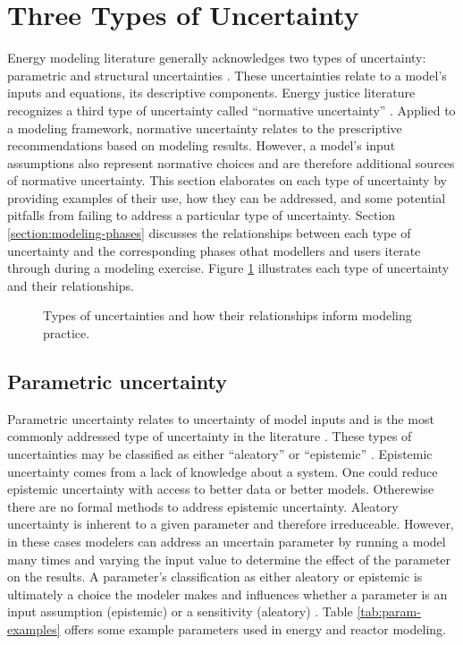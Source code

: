 \section{Three Types of Uncertainty}
\label{section:triple-uncertainty}

Energy modeling literature generally acknowledges two types of uncertainty:
parametric and structural uncertainties
\cite{yue_review_2018,decarolis_modelling_2016,price_modelling_2017,
feng_sensitivity_2020}. These uncertainties relate to a model's inputs and
equations, its descriptive components. Energy justice literature recognizes a
third type of uncertainty called ``normative uncertainty''
\cite{taebi_governing_2020, van_uffelen_revisiting_2024}. Applied to a modeling
framework, normative uncertainty relates to the prescriptive recommendations
based on modeling results. However, a model's input assumptions also represent
normative choices and are therefore additional sources of normative uncertainty.
This section elaborates on each type of uncertainty by providing examples of
their use, how they can be addressed, and some potential pitfalls from failing
to address a particular type of uncertainty. Section
\ref{section:modeling-phases} discusses the relationships between each type of
uncertainty and the corresponding phases othat modellers and users iterate
through during a modeling exercise. Figure \ref{fig:triarchic-uncertainty}
illustrates each type of uncertainty and their relationships.

\begin{figure}[ht!]
    \centering
    
    \caption{Types of uncertainties and how their relationships inform modeling practice.}
    \label{fig:triarchic-uncertainty}
\end{figure}

\subsection{Parametric uncertainty}
Parametric uncertainty relates to uncertainty of model inputs and is the most
commonly addressed type of uncertainty in the literature
\cite{yue_review_2018,decarolis_modelling_2016,morgan_uncertainty_1990}. These
types of uncertainties may be classified as either ``aleatory'' or ``epistemic''
\cite{kiureghian_aleatory_2009,pfenninger_energy_2014}. Epistemic uncertainty
comes from a lack of knowledge about a system. One could reduce epistemic
uncertainty with access to better data or better models. Otherewise there are no
formal methods to address epistemic uncertainty. Aleatory uncertainty is
inherent to a given parameter and therefore irreduceable. However, in these
cases modelers can address an uncertain parameter by running a model many times
and varying the input value to determine the effect of the parameter on the
results. A parameter's classification as either aleatory or epistemic is
ultimately a choice the modeler makes and influences whether a parameter is an
input assumption (epistemic) or a sensitivity (aleatory)
\cite{pfenninger_energy_2014}. Table \ref{tab:param-examples} offers some
example parameters used in energy and reactor modeling.

